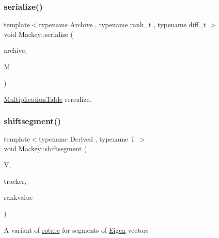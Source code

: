\subsubsection{\texorpdfstring{serialize()}{serialize()}\hspace{0.1cm}{\footnotesize\ttfamily [6/6]}}
{\footnotesize\ttfamily template$<$typename Archive , typename rank\+\_\+t , typename diff\+\_\+t $>$ \\
void Mackey\+::serialize (\begin{DoxyParamCaption}\item[{Archive \&}]{archive,  }\item[{\hyperlink{classMackey_1_1MultiplicationTable}{Multiplication\+Table}$<$ rank\+\_\+t, diff\+\_\+t $>$ \&}]{M }\end{DoxyParamCaption})}



\hyperlink{classMackey_1_1MultiplicationTable}{Multiplication\+Table} cerealize. 

\mbox{\label{namespaceMackey_aab8a6292210a3b71960cb03b79d218e6}} 
\subsubsection{\texorpdfstring{shiftsegment()}{shiftsegment()}}
{\footnotesize\ttfamily template$<$typename Derived , typename T $>$ \\
void Mackey\+::shiftsegment (\begin{DoxyParamCaption}\item[{Eigen\+::\+Matrix\+Base$<$ Derived $>$ \&}]{V,  }\item[{int}]{tracker,  }\item[{T}]{rankvalue }\end{DoxyParamCaption})}

A variant of \hyperlink{namespaceMackey_a38a833de54971845cbdb8c96f830725b}{rotate} for segments of \hyperlink{namespaceEigen}{Eigen} vectors

